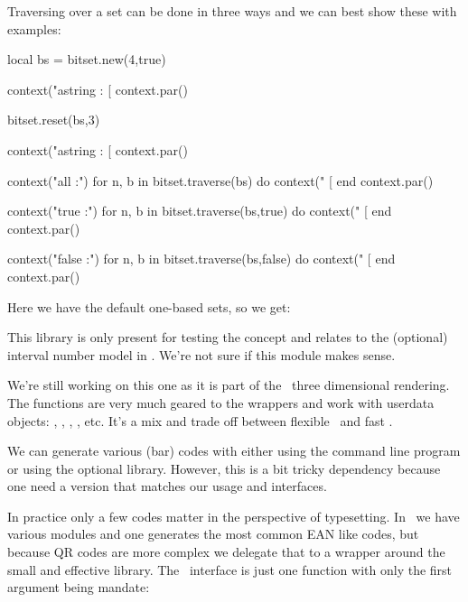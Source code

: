 Traversing over a set can be done in three ways and we can best show these with
examples:

\startbuffer
\startluacode

local bs = bitset.new(4,true)

context("astring : [%
context.par()

bitset.reset(bs,3)

context("astring : [%
context.par()

context("all :")
for n, b in bitset.traverse(bs) do
    context(" [%
end
context.par()

context("true :")
for n, b in bitset.traverse(bs,true) do
    context(" [%
end
context.par()

context("false :")
for n, b in bitset.traverse(bs,false) do
    context(" [%
end
context.par()
\stopluacode
\stopbuffer

\typebuffer[option=TEX]

Here we have the default one-based sets, so we get:

\startlines \tttf
\getbuffer
\stoplines

\stopsection

\startsubsection[title=Interval]

This library is only present for testing the concept and relates to the
(optional) interval number model in \METAPOST. We're not sure if this module
makes sense.

\stopsection

\startsubsection[title=Z-buffers]

We're still working on this one as it is part of the \LUAMETAFUN\ three
dimensional rendering. The functions are very much geared to the wrappers and
work with userdata objects: , , ,
, etc. It's a mix and trade off between flexible \LUA\ and fast
\CCODE.

\stopsection

\startsubsection[title=QR-codes]

We can generate various (bar) codes with  either using the command
line program or using the optional library. However, this is a bit tricky
dependency because one need a version that matches our usage and interfaces.

In practice only a few codes matter in the perspective of typesetting. In
\CONTEXT\ we have various modules and one generates the most common EAN like
codes, but because QR codes are more complex we delegate that to a wrapper around
the small and effective  library. The \LUA\ interface is just
one function with only the first argument being mandate:

